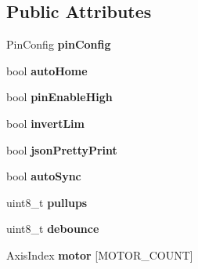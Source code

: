 \subsection*{Public Attributes}
\begin{DoxyCompactItemize}
\item 
\hypertarget{classfirestep_1_1_machine_a782abcc195edda445e1e9adc7c384162}{Pin\+Config {\bfseries pin\+Config}}\label{classfirestep_1_1_machine_a782abcc195edda445e1e9adc7c384162}

\item 
\hypertarget{classfirestep_1_1_machine_abae6d8416a6384963ac1012a214572b3}{bool {\bfseries auto\+Home}}\label{classfirestep_1_1_machine_abae6d8416a6384963ac1012a214572b3}

\item 
\hypertarget{classfirestep_1_1_machine_a0f41310222b04a7abb2ee9a1c6058622}{bool {\bfseries pin\+Enable\+High}}\label{classfirestep_1_1_machine_a0f41310222b04a7abb2ee9a1c6058622}

\item 
\hypertarget{classfirestep_1_1_machine_aeada7a6b5b4b0c946123bbf08bebcbd2}{bool {\bfseries invert\+Lim}}\label{classfirestep_1_1_machine_aeada7a6b5b4b0c946123bbf08bebcbd2}

\item 
\hypertarget{classfirestep_1_1_machine_aa0474d91c7cb5d7b5ee30caeab6089e1}{bool {\bfseries json\+Pretty\+Print}}\label{classfirestep_1_1_machine_aa0474d91c7cb5d7b5ee30caeab6089e1}

\item 
\hypertarget{classfirestep_1_1_machine_a83b501a8ac2e7ed939b68d82d7eb3500}{bool {\bfseries auto\+Sync}}\label{classfirestep_1_1_machine_a83b501a8ac2e7ed939b68d82d7eb3500}

\item 
\hypertarget{classfirestep_1_1_machine_a7378e019cbc4f093014380907b86f247}{uint8\+\_\+t {\bfseries pullups}}\label{classfirestep_1_1_machine_a7378e019cbc4f093014380907b86f247}

\item 
\hypertarget{classfirestep_1_1_machine_a861720eaf7bf69fd15cc627cb23bb3c6}{uint8\+\_\+t {\bfseries debounce}}\label{classfirestep_1_1_machine_a861720eaf7bf69fd15cc627cb23bb3c6}

\item 
\hypertarget{classfirestep_1_1_machine_ad525546aaffe13bccdf9dcc60e16c441}{Axis\+Index {\bfseries motor} \mbox{[}M\+O\+T\+O\+R\+\_\+\+C\+O\+U\+N\+T\mbox{]}}\label{classfirestep_1_1_machine_ad525546aaffe13bccdf9dcc60e16c441}


\end{DoxyCompactItemize}
